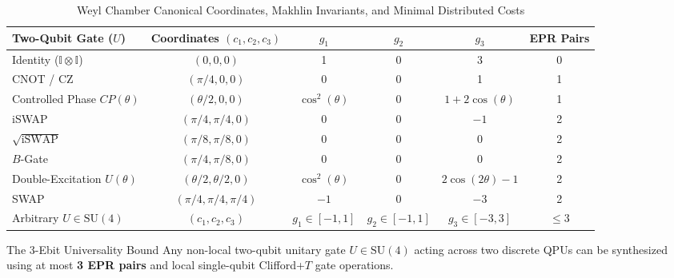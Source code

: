 \begin{table}[htbp]
\centering
\caption{Weyl Chamber Canonical Coordinates, Makhlin Invariants, and Minimal Distributed Costs}
\label{tab:weyl_coordinates_cost}
\begin{tabular}{l c c c c c}
\toprule
\textbf{Two-Qubit Gate ($U$)} & \textbf{Coordinates $(c_1, c_2, c_3)$} & \textbf{$g_1$} & \textbf{$g_2$} & \textbf{$g_3$} & \textbf{EPR Pairs} \\
\midrule
Identity ($\mathbb{I} \otimes \mathbb{I}$) & $(0, 0, 0)$ & 1 & 0 & 3 & 0 \\
CNOT / CZ & $(\pi/4, 0, 0)$ & 0 & 0 & 1 & 1 \\
Controlled Phase $CP(\theta)$ & $(\theta/2, 0, 0)$ & $\cos^2(\theta)$ & 0 & $1 + 2\cos(\theta)$ & 1 \\
iSWAP & $(\pi/4, \pi/4, 0)$ & 0 & 0 & $-1$ & 2 \\
$\sqrt{\text{iSWAP}}$ & $(\pi/8, \pi/8, 0)$ & 0 & 0 & 0 & 2 \\
$B$-Gate & $(\pi/4, \pi/8, 0)$ & 0 & 0 & 0 & 2 \\
Double-Excitation $U(\theta)$ & $(\theta/2, \theta/2, 0)$ & $\cos^2(\theta)$ & 0 & $2\cos(2\theta)-1$ & 2 \\
SWAP & $(\pi/4, \pi/4, \pi/4)$ & $-1$ & 0 & $-3$ & 2 \\
Arbitrary $U \in \text{SU}(4)$ & $(c_1, c_2, c_3)$ & $g_1 \in [-1, 1]$ & $g_2 \in [-1, 1]$ & $g_3 \in [-3, 3]$ & $\le 3$ \\
\bottomrule
\end{tabular}
\end{table}

\begin{theorembox}{The 3-Ebit Universality Bound}
Any non-local two-qubit unitary gate $U \in \text{SU}(4)$ acting across two discrete QPUs can be synthesized using at most \textbf{3 EPR pairs} and local single-qubit Clifford+$T$ gate operations.
\end{theorembox}


